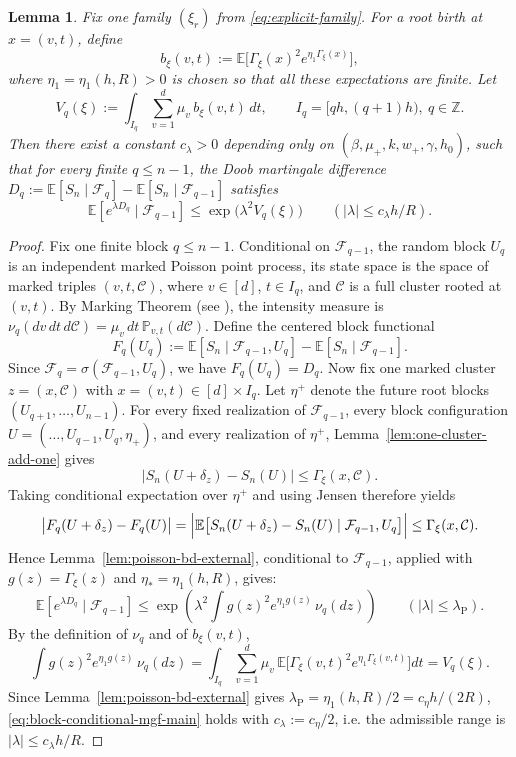 \documentclass{article}
\newtheorem{lemma}{Lemma}[section]
\newcommand{\Pbb}{\mathbb{P}}
\newcommand{\E}{\mathbb{E}}
\begin{document}
\begin{lemma}
\label{lem:block-conditional-mgf}
Fix one family $(\xi_r)$ from \eqref{eq:explicit-family}. For a root birth at $x=(v,t)$, define
\[
b_\xi(v,t):=\E\Big[\Gamma_\xi(x)^2 e^{\eta_1\Gamma_\xi(x)}\Big],
\]
where $\eta_1=\eta_1(h,R)>0$ is chosen so that all these expectations are finite. Let
\[
V_q(\xi):=\int_{I_q}\sum_{v=1}^d \mu_v\, b_\xi(v,t)\,dt,
\qquad I_q=[qh,(q+1)h),\ q\in\mathbb Z.
\]
Then there exist a constant $c_\lambda>0$ depending only on $(\beta,\mu_+,k,w_+,\gamma,h_0)$, such that for every finite $q\le n-1$, the Doob martingale difference $D_q:=\E[S_n\mid \mathcal F_q]-\E[S_n\mid \mathcal F_{q-1}]$ satisfies
\begin{equation}
\label{eq:block-conditional-mgf-main}
\E[e^{\lambda D_q}\mid \mathcal F_{q-1}]\le \exp\big(\lambda^2 V_q(\xi)\big)
\qquad (|\lambda|\le c_\lambda h/R).
\end{equation}
\end{lemma}
\begin{proof}
Fix one finite block $q\le n-1$. Conditional on $\mathcal F_{q-1}$, the random block $U_q$ is an independent marked Poisson point process, its state space is the space of marked triples $(v,t,\mathcal C)$, where $v\in[d]$, $t\in I_q$, and $\mathcal C$ is a full cluster rooted at $(v,t)$. By Marking Theorem (see \cite{last2018lectures}), the intensity measure is $\nu_q(dv\,dt\,d\mathcal C)=\mu_v\,dt\,\Pbb_{v,t}(d\mathcal C)$. Define the centered block functional 
\[
F_q(U_q):=\mathbb E[S_n\mid \mathcal F_{q-1},U_q]-\mathbb E[S_n\mid \mathcal F_{q-1}].
\]
Since $\mathcal F_q=\sigma(\mathcal F_{q-1},U_q)$, we have $F_q(U_q)=D_q$. Now fix one marked cluster $z=(x,\mathcal C)$ with $x=(v,t)\in[d]\times I_q$. Let $\eta^+$ denote the future root blocks $(U_{q+1},\dots,U_{n-1})$. 
For every fixed realization of $\mathcal F_{q-1}$, every block configuration $U=(\dots,U_{q-1},U_q,\eta_+)$, and every realization of $\eta^+$, Lemma~\ref{lem:one-cluster-add-one} gives
\[
\bigl|S_n(U+\delta_z) - S_n(U)\bigr|\le \Gamma_\xi(x,\mathcal C).
\]
Taking conditional expectation over $\eta^+$ and using Jensen therefore yields
\[
\bigl|F_q(U+\delta_z)-F_q(U)\bigr|
=\Bigl|\mathbb E\bigl[S_n(U+\delta_z) - S_n(U)\mid \mathcal F_{q-1},U_q\bigr]\Bigr|
\le \Gamma_\xi(x,\mathcal C).
\]
Hence Lemma~\ref{lem:poisson-bd-external}, conditional to $\mathcal F_{q-1}$, applied with $g(z)=\Gamma_{\xi}(z)$ and $\eta_*=\eta_1(h,R)$, gives:
\[
\E[e^{\lambda D_q}\mid \mathcal F_{q-1}]\le \exp\!\left(\lambda^2 \int g(z)^2 e^{\eta_1 g(z)}\,\nu_q(dz)\right)
\qquad (|\lambda|\le \lambda_\mathrm{P}).
\]
By the definition of $\nu_q$ and of $b_\xi(v,t)$,
\[
\int g(z)^2 e^{\eta_1 g(z)}\,\nu_q(dz)
=\int_{I_q}\sum_{v=1}^d \mu_v\,\E\Big[\Gamma_\xi(v,t)^2 e^{\eta_1\Gamma_\xi(v,t)}\Big]dt
=V_q(\xi).
\]
Since Lemma~\ref{lem:poisson-bd-external} gives $\lambda_\mathrm{P}=\eta_1(h,R)/2=c_\eta h/(2R)$, \eqref{eq:block-conditional-mgf-main} holds with $c_\lambda:=c_\eta/2$, i.e. the admissible range is $|\lambda|\le c_\lambda h/R$.
\end{proof}
\end{document}
